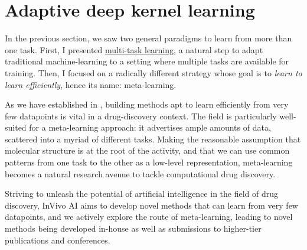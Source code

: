 \documentclass[11pt]{article}
\numberwithin{equation}{subsection}
\begin{document}



\clearpage
\section{Adaptive deep kernel learning}

In the previous section, we saw two general paradigms to learn from more than one task. First, I presented  \hyperref[sec:multitask]{multi-task learning}, a natural step to adapt traditional machine-learning to a setting where multiple tasks are available for training. Then, I focused on a radically different strategy whose goal is to \textit{learn to learn efficiently}, hence its name: meta-learning.


As we have established in , building methods apt to learn efficiently from very few datapoints is vital in a drug-discovery context. The field is particularly well-suited for a meta-learning approach: it advertises ample amounts of data, scattered into a myriad of different tasks. Making the reasonable assumption that molecular structure is at the root of the activity, and that we can use common patterns from one task to the other as a low-level representation, meta-learning becomes a natural research avenue to tackle computational drug discovery.

Striving to unleash the potential of artificial intelligence in the field of drug discovery, InVivo AI aims to develop novel methods that can learn from very few datapoints, and we actively explore the route of meta-learning, leading to novel methods being developed in-house as well as submissions to higher-tier publications and conferences.
\end{document}
